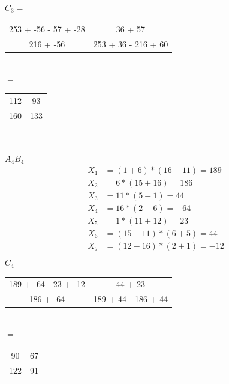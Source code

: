 \documentclass{article}
\begin{document}
\begin{enumerate}
\begin{multicols}{2}
\begin{center}
\begin{align*}
            \end{align*}
            $C_3=$
            \begin{tabular}{|c c|}
                \hline
                253 + -56 - 57 + -28 &36 + 57\\
                216 + -56& 253 + 36 - 216 + 60\\
                \hline
            \end{tabular}\\
            $=$
            \begin{tabular}{|c c|}
                \hline
                112&93\\
                160&133\\
                \hline
            \end{tabular}\\
        \end{center}

        \begin{center}
            $A_4B_4$\\
            \begin{align*}
                X_1 &= (1 + 6) * (16 + 11) = 189\\
                X_2 &= 6 * (15 + 16) = 186\\
                X_3 &= 11 * (5-1) = 44\\
                X_4 &= 16 * (2 - 6) = -64\\
                X_5 &= 1 * (11 + 12) = 23 \\
                X_6 &= (15 - 11) * (6 + 5) = 44\\
                X_7 &= (12 - 16) * (2 + 1) = -12\\
            \end{align*}
            $C_4=$
            \begin{tabular}{|c c|}
                \hline
                189 + -64 - 23 + -12 &44 + 23\\
                186 + -64& 189 + 44 - 186 + 44\\
                \hline
            \end{tabular}\\
            $=$
            \begin{tabular}{|c c|}
                \hline
                90&67\\
                122&91\\
                \hline
            \end{tabular}\\
        \end{center}
    \end{multicols}


\end{enumerate}
\end{document}
